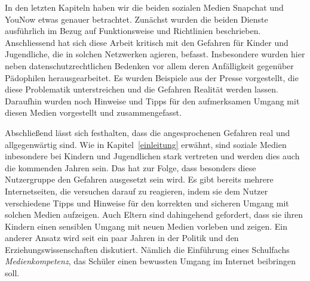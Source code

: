 In den letzten Kapiteln haben wir die beiden sozialen Medien Snapchat und
YouNow etwas genauer betrachtet. Zun\"achst wurden die beiden Dienste
ausf\"uhrlich im Bezug auf Funktionsweise und Richtlinien beschrieben.
Anschliessend hat sich diese Arbeit kritisch mit den Gefahren f\"ur Kinder und
Jugendliche, die in solchen Netzwerken agieren, befasst. Insbesondere wurden
hier neben datenschutzrechtlichen Bedenken vor allem deren Anf\"alligkeit
gegen\"uber P\"adophilen herausgearbeitet. Es wurden Beispiele aus der Presse
vorgestellt, die diese Problematik unterstreichen und die Gefahren Realit\"at
werden lassen. Daraufhin wurden noch Hinweise und Tipps f\"ur den
aufmerksamen Umgang mit diesen Medien vorgestellt und zusammengefasst.


Abschlie{\ss}end l\"asst sich festhalten, dass die angesprochenen Gefahren real
und allgegenw\"artig sind. Wie in Kapitel~\ref{einleitung} erw\"ahnt, sind
soziale Medien inbesondere bei Kindern und Jugendlichen stark vertreten und
werden dies auch die kommenden Jahren sein. Das hat zur Folge, dass besonders
diese Nutzergruppe den Gefahren ausgesetzt sein wird. Es gibt bereits mehrere
Internetseiten, die versuchen darauf zu reagieren, indem sie dem Nutzer
verschiedene Tipps und Hinweise f\"ur den korrekten und sicheren Umgang mit
solchen Medien aufzeigen. Auch Eltern sind dahingehend gefordert, dass sie
ihren Kindern einen sensiblen Umgang mit neuen Medien vorleben und zeigen. Ein
anderer Ansatz wird seit ein paar Jahren in der Politik und den
Erziehungswissenschaften diskutiert. N\"amlich die Einf\"uhrung eines
Schulfachs \emph{Medienkompetenz}, das Sch\"uler einen bewussten Umgang im
Internet beibringen soll.
